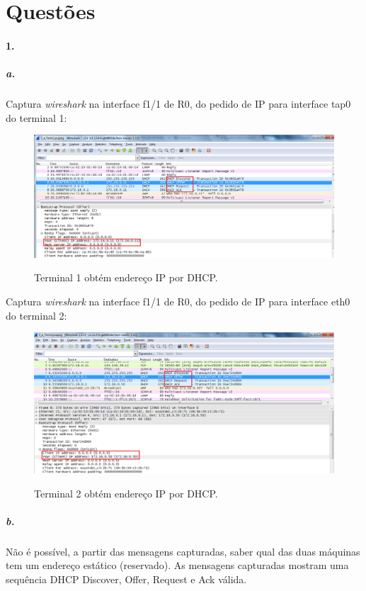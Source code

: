 \section*{Questões}
\paragraph{1.}

\subparagraph{a.}
Captura \emph{wireshark} na interface f1/1 de \textsf{R0}, do pedido de IP para interface \textsf{tap0} do \textsf{terminal 1}:

\begin{figure}[h]
\centering
\includegraphics[width=1\textwidth, height=0.3\textheight]{1_a_Terminal1.png}
\label{fig:Term1 DHCP}
\caption{Terminal 1 obtém endereço IP por DHCP.}
\end{figure}

Captura \emph{wireshark} na interface f1/1 de \textsf{R0}, do pedido de IP para interface \textsf{eth0} do \textsf{terminal 2}:

\begin{figure}[h]
\centering
\includegraphics[width=1\textwidth, height=0.33\textheight]{1_a_Terminal2.png}
\label{fig:Term2 DHCP}
\caption{Terminal 2 obtém endereço IP por DHCP.}
\end{figure}


\subparagraph{b.}
Não é possível, a partir das mensagens capturadas, saber qual das duas
máquinas tem um endereço estático (reservado). As mensagens capturadas
mostram uma sequência \textsf{DHCP Discover}, \textsf{Offer}, \textsf{Request} e \textsf{Ack} válida.

